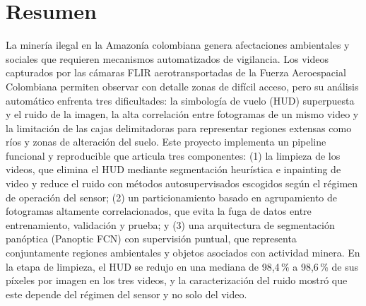 \section*{Resumen}
La minería ilegal en la Amazonía colombiana genera afectaciones ambientales y sociales que requieren mecanismos automatizados de vigilancia. Los videos capturados por las cámaras FLIR aerotransportadas de la Fuerza Aeroespacial Colombiana permiten observar con detalle zonas de difícil acceso, pero su análisis automático enfrenta tres dificultades: la simbología de vuelo (HUD) superpuesta y el ruido de la imagen, la alta correlación entre fotogramas de un mismo video y la limitación de las cajas delimitadoras para representar regiones extensas como ríos y zonas de alteración del suelo. Este proyecto implementa un pipeline funcional y reproducible que articula tres componentes: (1) la limpieza de los videos, que elimina el HUD mediante segmentación heurística e inpainting de video y reduce el ruido con métodos autosupervisados escogidos según el régimen de operación del sensor; (2) un particionamiento basado en agrupamiento de fotogramas altamente correlacionados, que evita la fuga de datos entre entrenamiento, validación y prueba; y (3) una arquitectura de segmentación panóptica (Panoptic FCN) con supervisión puntual, que representa conjuntamente regiones ambientales y objetos asociados con actividad minera. En la etapa de limpieza, el HUD se redujo en una mediana de 98,4\,\% a 98,6\,\% de sus píxeles por imagen en los tres videos, y la caracterización del ruido mostró que este depende del régimen del sensor y no solo del video. 
